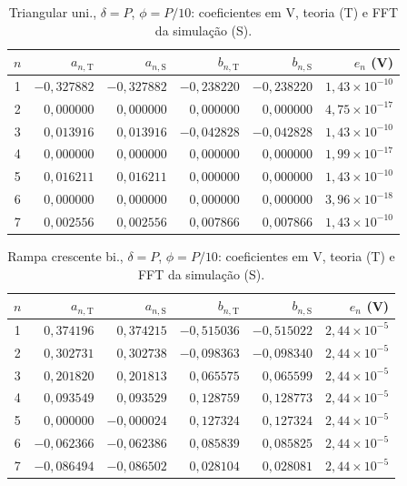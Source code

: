 \begin{table}[H]
\centering
\footnotesize\setlength{\tabcolsep}{2pt}
\caption{Triangular uni., $\delta=P$, $\phi=P/10$: coeficientes em V, teoria (T) e FFT da simulação (S).}\label{tab:coef_comp9}
\begin{tabular}{crrrrr}\hline
$n$ & $a_{n,\mathrm T}$ & $a_{n,\mathrm S}$ & $b_{n,\mathrm T}$ & $b_{n,\mathrm S}$ & $e_n$ (V) \\ \hline
1 & $-0{,}327882$ & $-0{,}327882$ & $-0{,}238220$ & $-0{,}238220$ & $1{,}43\!\times\!10^{-10}$ \\
2 & $0{,}000000$ & $0{,}000000$ & $0{,}000000$ & $0{,}000000$ & $4{,}75\!\times\!10^{-17}$ \\
3 & $0{,}013916$ & $0{,}013916$ & $-0{,}042828$ & $-0{,}042828$ & $1{,}43\!\times\!10^{-10}$ \\
4 & $0{,}000000$ & $0{,}000000$ & $0{,}000000$ & $0{,}000000$ & $1{,}99\!\times\!10^{-17}$ \\
5 & $0{,}016211$ & $0{,}016211$ & $0{,}000000$ & $0{,}000000$ & $1{,}43\!\times\!10^{-10}$ \\
6 & $0{,}000000$ & $0{,}000000$ & $0{,}000000$ & $0{,}000000$ & $3{,}96\!\times\!10^{-18}$ \\
7 & $0{,}002556$ & $0{,}002556$ & $0{,}007866$ & $0{,}007866$ & $1{,}43\!\times\!10^{-10}$ \\
\hline\end{tabular}
\end{table}
\begin{table}[H]
\centering
\footnotesize\setlength{\tabcolsep}{2pt}
\caption{Rampa crescente bi., $\delta=P$, $\phi=P/10$: coeficientes em V, teoria (T) e FFT da simulação (S).}\label{tab:coef_comp10}
\begin{tabular}{crrrrr}\hline
$n$ & $a_{n,\mathrm T}$ & $a_{n,\mathrm S}$ & $b_{n,\mathrm T}$ & $b_{n,\mathrm S}$ & $e_n$ (V) \\ \hline
1 & $0{,}374196$ & $0{,}374215$ & $-0{,}515036$ & $-0{,}515022$ & $2{,}44\!\times\!10^{-5}$ \\
2 & $0{,}302731$ & $0{,}302738$ & $-0{,}098363$ & $-0{,}098340$ & $2{,}44\!\times\!10^{-5}$ \\
3 & $0{,}201820$ & $0{,}201813$ & $0{,}065575$ & $0{,}065599$ & $2{,}44\!\times\!10^{-5}$ \\
4 & $0{,}093549$ & $0{,}093529$ & $0{,}128759$ & $0{,}128773$ & $2{,}44\!\times\!10^{-5}$ \\
5 & $0{,}000000$ & $-0{,}000024$ & $0{,}127324$ & $0{,}127324$ & $2{,}44\!\times\!10^{-5}$ \\
6 & $-0{,}062366$ & $-0{,}062386$ & $0{,}085839$ & $0{,}085825$ & $2{,}44\!\times\!10^{-5}$ \\
7 & $-0{,}086494$ & $-0{,}086502$ & $0{,}028104$ & $0{,}028081$ & $2{,}44\!\times\!10^{-5}$ \\
\hline\end{tabular}
\end{table}
